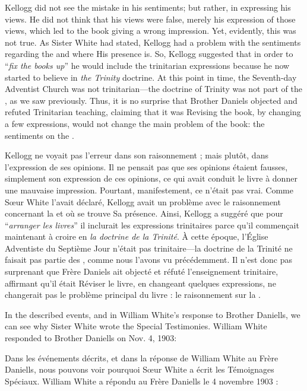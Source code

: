Kellogg did not see the mistake in his sentiments; but rather, in expressing his views. He did not think that his views were false, merely his expression of those views, which led to the book giving a wrong impression. Yet, evidently, this was not true. As Sister White had stated, Kellogg had a problem with the sentiments regarding the  and where His presence is. So, Kellogg suggested that in order to “\textit{fix the books up}” he would include the trinitarian expressions because he now started to believe in \textit{the Trinity} doctrine. At this point in time, the Seventh-day Adventist Church was not trinitarian—the doctrine of Trinity was not part of the , as we saw previously. Thus, it is no surprise that Brother Daniels objected and refuted Trinitarian teaching, claiming that it was Revising the book, by changing a few expressions, would not change the main problem of the book: the sentiments on the .


Kellogg ne voyait pas l'erreur dans son raisonnement ; mais plutôt, dans l'expression de ses opinions. Il ne pensait pas que ses opinions étaient fausses, simplement son expression de ces opinions, ce qui avait conduit le livre à donner une mauvaise impression. Pourtant, manifestement, ce n'était pas vrai. Comme Sœur White l'avait déclaré, Kellogg avait un problème avec le raisonnement concernant la  et où se trouve Sa présence. Ainsi, Kellogg a suggéré que pour “\textit{arranger les livres}” il inclurait les expressions trinitaires parce qu'il commençait maintenant à croire en \textit{la doctrine de la Trinité}. À cette époque, l'Église Adventiste du Septième Jour n'était pas trinitaire—la doctrine de la Trinité ne faisait pas partie des , comme nous l'avons vu précédemment. Il n'est donc pas surprenant que Frère Daniels ait objecté et réfuté l'enseignement trinitaire, affirmant qu'il était Réviser le livre, en changeant quelques expressions, ne changerait pas le problème principal du livre : le raisonnement sur la .


In the described events, and in William White's response to Brother Daniells, we can see why Sister White wrote the Special Testimonies. William White responded to Brother Daniells on Nov. 4, 1903:


Dans les événements décrits, et dans la réponse de William White au Frère Daniells, nous pouvons voir pourquoi Sœur White a écrit les Témoignages Spéciaux. William White a répondu au Frère Daniells le 4 novembre 1903 :


